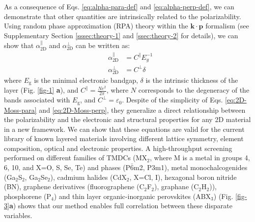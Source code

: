 \documentclass[journal=ancac3,manuscript=article,email=true,hyperref=true,keywords=false]{achemso}
\begin{document}
As a consequence of Eqs. \ref{eq:alpha-para-def} and \ref{eq:alpha-perp-def}, we can demonstrate 
that other quantities are intrinsically related to the polarizability. 
Using random phase approximation (RPA)
theory \cite{Adler_1962} within the $\mathbf{k} \cdot \mathbf{p}$
formalism\cite{kittel_2005_introduction} (see Supplementary
Section \ref{sssec:theory-1} and  \ref{ssec:theory-2} for details), 
we can show that
$\alpha_{\mathrm{2D}}^{\parallel}$ and $\alpha_{\mathrm{2D}}^{\perp}$
can be written as: 
%
%
%
\begin{subequations}
\begin{eqnarray}
\label{eq:2D-Moss-para}
  &\alpha_{\mathrm{2D}}^{\parallel} &=C^{\parallel} E_{g}^{-1} \\
  \label{eq:2D-Moss-perp}
  &\alpha_{\mathrm{2D}}^{\perp} & =C^{\perp} \delta
\end{eqnarray}
\end{subequations}
%
%
%
%
where $E_{\mathrm{g}}$ is the minimal electronic bandgap, $\delta$ is
the intrinsic thickness of the layer (Fig. \ref{fig-1}{\bf
  a}), and $C^{\parallel} = \frac{Ne^2}{2 \pi}$, where $N$ corresponds to
the degeneracy of the bands associated with $E_{\mathrm{g}}$, and
$C^{\perp} = {\varepsilon_{0}}$.   Despite of the simplicity of Eqs. \ref{eq:2D-Moss-para} and
\ref{eq:2D-Moss-perp}, they generalize a direct relationship between
the polarizability and the electronic and structural properties for
any 2D material in a new framework.  We can show that these equations
are valid for the current library of known layered materials involving
different lattice symmetry, element composition, optical and
electronic properties.
%
A high-throughput screening performed on 
different families of TMDCs (MX\(_{\text{2}}\), where M is
a metal in groups 4, 6, 10, and X=O, S, Se, Te) and phases (P\(\bar{6}\)m2, P3m1), 
metal monochalcogenides
(Ga$_{2}$S$_{2}$, Ga$_{2}$Se$_{2}$), cadmium halides (CdX$_2$, X=Cl,
I), hexagonal boron nitride (BN), graphene derivatives (fluorographene
(C$_{2}$F$_{2}$), graphane (C$_{2}$H$_{2}$)), phosphorene (P$_{4}$)
and thin layer organic-inorganic perovskites (ABX$_{3}$) (Fig. \ref{fig-3}{\bf a}) 
shows that our method enables full correlation between these disparate variables. 
%
%
\end{document}
